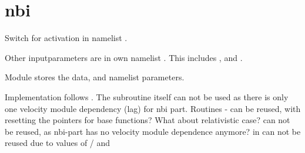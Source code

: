 \section{nbi}

Switch for activation  in namelist
.

Other inputparameters are in own namelist .
This includes ,
 and
.

Module  stores the data, and namelist
parameters.

Implementation follows . The subroutine
itself can not be used as there is only one velocity module dependency
(lag) for nbi part.
Routines - can
be reused, with resetting the pointers for base functions?
What about relativistic case?
 can not be reused, as nbi-part has no
velocity module dependence anymore?
 in  can
not be reused due to values of /
and 
